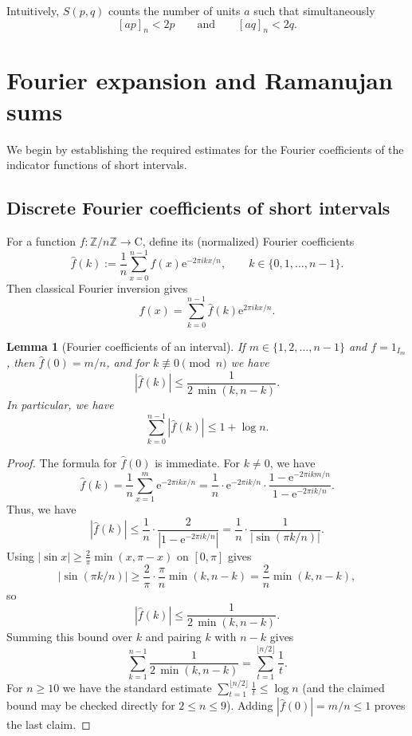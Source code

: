\documentclass[12pt]{amsart}
\newtheorem{lemma}[theorem]{Lemma}
\newcommand{\Z}{\mathbb{Z}}
\newcommand{\e}{\mathrm{e}}
\newcommand{\C}{\mathrm{C}}
\begin{document}
Intuitively, $S(p,q)$ counts the number of units $a$ such that simultaneously
$$[ap]_n<2p \qquad \text{and}\qquad [aq]_n<2q.$$


\section{Fourier expansion and Ramanujan sums}\label{Section3}

We begin by establishing the required estimates for the Fourier coefficients of the indicator functions of short intervals.

\subsection{Discrete Fourier coefficients of short intervals}

For a function $f:\Z/n\Z\to\C$, define its (normalized) Fourier coefficients
\[
\widehat{f}(k):=\frac{1}{n}\sum_{x=0}^{n-1} f(x)\e^{-2\pi i kx/n},
\qquad k\in\{0,1,\dots,n-1\}.
\]
Then classical Fourier inversion gives 
\[
f(x)=\sum_{k=0}^{n-1} \widehat{f}(k)\e^{2\pi i kx/n}.
\]

\begin{lemma}[Fourier coefficients of an interval]
\label{lem:intervalFourier}
If $m\in\{1,2,\dots,n-1\}$ and $f=1_{I_m}$, then
 $\widehat{f}(0)=m/n$, and for $k\not\equiv 0\pmod n$ we have
\[
|\widehat{f}(k)|\le \frac{1}{2\,\min(k,n-k)}.
\]
In particular, we have
\[
\sum_{k=0}^{n-1}|\widehat{f}(k)|\le 1+\log n.
\]
\end{lemma}

\begin{proof}
The formula for $\widehat{f}(0)$ is immediate.
For $k\ne 0$, we have
\[
\widehat{f}(k)=\frac{1}{n}\sum_{x=1}^m \e^{-2\pi i kx/n}
= \frac{1}{n}\cdot \e^{-2\pi i k/n}\cdot \frac{1-\e^{-2\pi i km/n}}{1-\e^{-2\pi i k/n}}.
\]
Thus, we have
\[
|\widehat{f}(k)|\le \frac{1}{n}\cdot \frac{2}{|1-\e^{-2\pi i k/n}|}
= \frac{1}{n}\cdot \frac{1}{|\sin(\pi k/n)|}.
\]
Using $|\sin x|\ge \frac{2}{\pi}\min(x,\pi-x)$ on $[0,\pi]$ gives
\[
|\sin(\pi k/n)|\ge \frac{2}{\pi}\cdot \frac{\pi}{n}\min(k,n-k)=\frac{2}{n}\min(k,n-k),
\]
so
\[
|\widehat{f}(k)|\le \frac{1}{2\,\min(k,n-k)}.
\]
Summing this bound over $k$ and pairing $k$ with $n-k$ gives
\[
\sum_{k=1}^{n-1}\frac{1}{2\,\min(k,n-k)}=\sum_{t=1}^{\lfloor n/2\rfloor}\frac{1}{t}.
\]
For $n\ge 10$ we have the standard estimate $\sum_{t=1}^{\lfloor n/2\rfloor}\frac{1}{t}\le \log n$ (and the claimed bound may be checked directly for $2\le n\le 9$). Adding $|\widehat{f}(0)|=m/n\le 1$ proves the last claim.
\end{proof}
\end{document}
